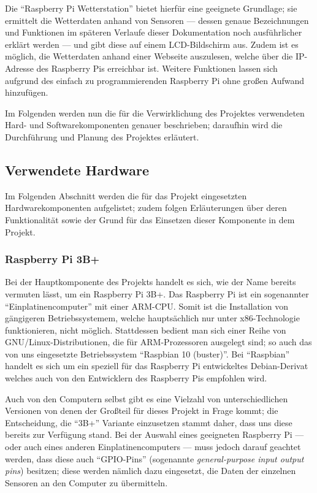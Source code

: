 \documentclass[a4paper,12pt]{article}
\begin{document}
Die "`Raspberry Pi Wetterstation"' bietet hierfür eine geeignete Grundlage; sie ermittelt die Wetterdaten anhand von Sensoren — dessen genaue Bezeichnungen und Funktionen im späteren Verlaufe dieser Dokumentation noch ausführlicher erklärt werden — und gibt diese auf einem LCD-Bildschirm aus. Zudem ist es möglich, die Wetterdaten anhand einer Webseite auszulesen, welche über die IP-Adresse des Raspberry Pis erreichbar ist. Weitere Funktionen lassen sich aufgrund des einfach zu programmierenden Raspberry Pi ohne großen Aufwand hinzufügen.

Im Folgenden werden nun die für die Verwirklichung des Projektes verwendeten Hard- und Softwarekomponenten genauer beschrieben; daraufhin wird die Durchführung und Planung des Projektes erläutert.
\pagebreak

\subsection{Verwendete Hardware}
Im Folgenden Abschnitt werden die für das Projekt eingesetzten Hardwarekomponenten aufgelistet; zudem folgen Erläuterungen über deren Funktionalität sowie der Grund für das Einsetzen dieser Komponente in dem Projekt.

\subsubsection{Raspberry Pi 3B+}
Bei der Hauptkomponente des Projekts handelt es sich, wie der Name bereits vermuten lässt, um ein Raspberry Pi 3B+.
Das Raspberry Pi ist ein sogenannter "`Einplatinencomputer"' mit einer ARM-CPU. Somit ist die Installation von gängigeren Betriebssystemem, welche hauptsächlich nur unter x86-Technologie funktionieren, nicht möglich. Stattdessen bedient man sich einer Reihe von GNU/Linux-Distributionen, die für ARM-Prozessoren ausgelegt sind; so auch das von uns eingesetzte Betriebssystem "`Raspbian 10 (buster)"'. Bei "`Raspbian"' handelt es sich um ein speziell für das Raspberry Pi entwickeltes Debian-Derivat welches auch von den Entwicklern des Raspberry Pis empfohlen wird.

Auch von den Computern selbst gibt es eine Vielzahl von unterschiedlichen Versionen von denen der Großteil für dieses Projekt in Frage kommt; die Entscheidung, die "`3B+"' Variante einzusetzen stammt daher, dass uns diese bereits zur Verfügung stand. Bei der Auswahl eines geeigneten Raspberry Pi — oder auch eines anderen Einplatinencomputers — muss jedoch darauf geachtet werden, dass diese auch "`GPIO-Pins"' (sogenannte \textit{general-purpose input output pins}) besitzen; diese werden nämlich dazu eingesetzt, die Daten der einzelnen Sensoren an den Computer zu übermitteln.
\end{document}
